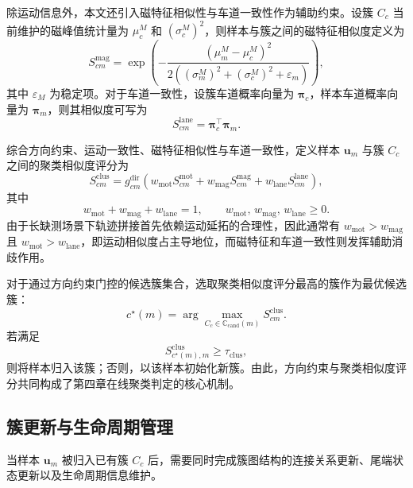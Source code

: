 \documentclass{xdupgthesis}
\begin{document}
除运动信息外，本文还引入磁特征相似性与车道一致性作为辅助约束。设簇 $C_c$ 当前维护的磁峰值统计量为 $\mu_c^{M}$ 和 $(\sigma_c^{M})^{2}$，则样本与簇之间的磁特征相似度定义为
\begin{equation}
	S_{cm}^{\mathrm{mag}}
	=
	\exp\!\left(
	-\frac{
		(\mu_m^{M}-\mu_c^{M})^2
	}{
		2\left((\sigma_m^{M})^{2}+(\sigma_c^{M})^{2}+\varepsilon_m\right)
	}
	\right),
\end{equation}
其中 $\varepsilon_M$ 为稳定项。对于车道一致性，设簇车道概率向量为 $\boldsymbol{\pi}_c$，样本车道概率向量为 $\boldsymbol{\pi}_m$，则其相似度可写为
\begin{equation}
	S_{cm}^{\mathrm{lane}}
	=
	\boldsymbol{\pi}_c^{\top}\boldsymbol{\pi}_m.
\end{equation}

综合方向约束、运动一致性、磁特征相似性与车道一致性，定义样本 $\mathbf{u}_m$ 与簇 $C_c$ 之间的聚类相似度评分为
\begin{equation}
	S_{cm}^{\mathrm{clus}}
	=
	g_{cm}^{\mathrm{dir}}
	\left(
	w_{\mathrm{mot}}S_{cm}^{\mathrm{mot}}
	+
	w_{\mathrm{mag}}S_{cm}^{\mathrm{mag}}
	+
	w_{\mathrm{lane}}S_{cm}^{\mathrm{lane}}
	\right),
\end{equation}
其中
\begin{equation}
	w_{\mathrm{mot}}+w_{\mathrm{mag}}+w_{\mathrm{lane}}=1,\qquad
	w_{\mathrm{mot}},\,w_{\mathrm{mag}},\,w_{\mathrm{lane}}\ge 0.
\end{equation}
由于长缺测场景下轨迹拼接首先依赖运动延拓的合理性，因此通常有 $w_{\mathrm{mot}}>w_{\mathrm{mag}}$ 且 $w_{\mathrm{mot}}>w_{\mathrm{lane}}$，即运动相似度占主导地位，而磁特征和车道一致性则发挥辅助消歧作用。

对于通过方向约束门控的候选簇集合，选取聚类相似度评分最高的簇作为最优候选簇：
\begin{equation}
	c^{\star}(m)
	=
	\arg\max_{C_c\in\mathbb{C}_{\mathrm{cand}}(m)}
	S_{cm}^{\mathrm{clus}}.
\end{equation}
若满足
\begin{equation}
	S_{c^{\star}(m),m}^{\mathrm{clus}} \ge \tau_{\mathrm{clus}},
\end{equation}
则将样本归入该簇；否则，以该样本初始化新簇。由此，方向约束与聚类相似度评分共同构成了第四章在线聚类判定的核心机制。

\subsection{簇更新与生命周期管理}

当样本 $\mathbf{u}_m$ 被归入已有簇 $C_c$ 后，需要同时完成簇图结构的连接关系更新、尾端状态更新以及生命周期信息维护。
\end{document}
